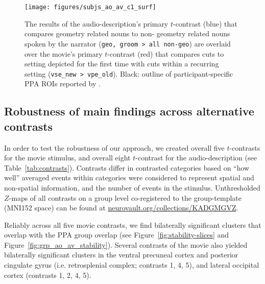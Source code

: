 \documentclass[english,11pt]{article}
\begin{document}
\begin{figure*}[tbp]
\centering
    \texttt{[image: figures/subjs\_ao\_av\_c1\_surf]}
    \caption[Fixed-effects individual-level GLM results ($Z$>3.4, $p$<.05
        cluster-corrected)
        projected onto reconstructed subject-specific brain surfaces.]
        {The results of the audio-description's primary
        $t$-contrast (blue) that compares geometry related nouns to non-
        geometry related nouns spoken by the narrator
        (\texttt{geo, groom > all non-geo}) are overlaid over the movie's
        primary $t$-contrast (red) that compares cuts to setting depicted for
        the first time with cuts within a recurring setting
        (\texttt{vse\_new > vpe\_old}).
        Black: outline of participant-specific PPA ROIs reported by
        \citet{sengupta2016extension}.
        }
    \label{fig:subjs_ao_av_c1_surf}
\end{figure*}


\subsection*{Robustness of main findings across alternative contrasts}

In order to test the robustness of our approach, we created overall five
$t$-contrasts for the movie stimulus, and overall eight $t$-contrast for the
audio-description (see Table~\ref{tab:contrasts}).
Contrasts differ in contrasted categories based on ``how well'' averaged events
within categories were considered to represent spatial and non-spatial
information, and the number of events in the stimulus.
Unthresholded $Z$-maps of all contrasts on a group level co-registered to the
group-template (MNI152 space) can be found at
\href{https://neurovault.org/collections/KADGMGVZ/}{\url{neurovault.org/collections/KADGMGVZ}}.


Reliably across all five movie contrasts, we find bilaterally significant
clusters that overlap with the PPA group overlap (see
Figure~\ref{fig:stability-slices} and Figure~\ref{fig:grp_ao_av_stability}).
Several contrasts of the movie also yielded bilaterally significant clusters in
the ventral precuneal cortex and posterior cingulate gyrus (i.e. retrosplenial
complex; contrasts 1, 4, 5), and lateral occipital cortex (contrasts 1, 2, 4,
5).
\end{document}

